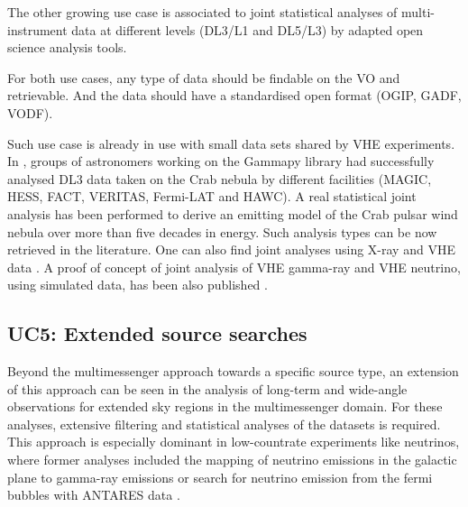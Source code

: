 \documentclass[11pt,a4paper]{ivoa}
\begin{document}
{The other growing use case is associated to joint statistical analyses of multi-instrument data at different levels
(DL3/L1 and DL5/L3) by adapted open science analysis tools.

For both use cases, any type of data should be findable on the \gls{VO} and retrievable. And the data should have a
standardised open format (\gls{OGIP}, \gls{GADF}, \gls{VODF}).

Such use case is already in use with small data sets shared by \gls{VHE} experiments. In
\citep{2019A&A...625A..10N, 2022A&A...667A..36A}, groups of astronomers working on the Gammapy library had successfully
analysed DL3 data taken on the Crab nebula by different facilities (MAGIC, \gls{HESS}, FACT, VERITAS, Fermi-LAT and HAWC).
A real statistical joint analysis has been performed to derive an emitting model of the Crab pulsar wind nebula over more
than five decades in energy. Such analysis types can be now retrieved in the literature. One can also find joint analyses using X-ray and \gls{VHE} data \citep{giunti2022}. A proof of concept of joint analysis of \gls{VHE} gamma-ray and \gls{VHE} neutrino,
using simulated data, has been also published \citep{unbehaun2024}.

\subsection{UC5: Extended source searches}

Beyond the multimessenger approach towards a specific source type, an extension of this approach can be seen in the analysis
of long-term and wide-angle observations for extended sky regions in the multimessenger domain. For these analyses, extensive filtering
and statistical analyses of the datasets is required. This approach is especially dominant in low-countrate experiments like neutrinos,
where former analyses included the mapping of neutrino emissions in the galactic plane to gamma-ray emissions \citep{doi:10.1126/science.adc9818}
or search for neutrino emission from the fermi bubbles with \gls{ANTARES} data \citep{ANTARES2014}.


}
\end{document}
